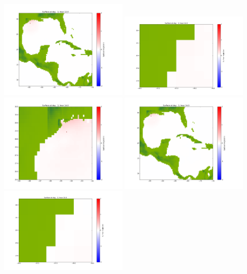 \documentclass[11pt]{article}
\begin{document}
\vskip 10pt 
\includegraphics[width=0.475\textwidth]{frame0066fig1003.png}
\vskip 10pt 
\includegraphics[width=0.475\textwidth]{frame0067fig1001.png}
\includegraphics[width=0.475\textwidth]{frame0067fig1002.png}
\vskip 10pt 
\includegraphics[width=0.475\textwidth]{frame0067fig1003.png}
\vskip 10pt 
\includegraphics[width=0.475\textwidth]{frame0068fig1001.png}
\end{document}
